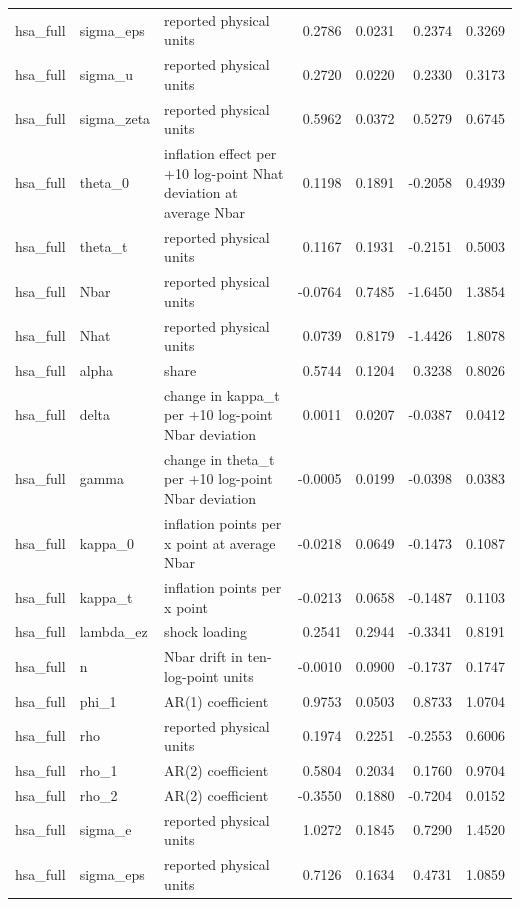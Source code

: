 \begin{tabular}{lllrrrr}
hsa\_full & sigma\_eps & reported physical units & 0.2786 & 0.0231 & 0.2374 & 0.3269 \\
hsa\_full & sigma\_u & reported physical units & 0.2720 & 0.0220 & 0.2330 & 0.3173 \\
hsa\_full & sigma\_zeta & reported physical units & 0.5962 & 0.0372 & 0.5279 & 0.6745 \\
hsa\_full & theta\_0 & inflation effect per +10 log-point Nhat deviation at average Nbar & 0.1198 & 0.1891 & -0.2058 & 0.4939 \\
hsa\_full & theta\_t & reported physical units & 0.1167 & 0.1931 & -0.2151 & 0.5003 \\
hsa\_full & Nbar & reported physical units & -0.0764 & 0.7485 & -1.6450 & 1.3854 \\
hsa\_full & Nhat & reported physical units & 0.0739 & 0.8179 & -1.4426 & 1.8078 \\
hsa\_full & alpha & share & 0.5744 & 0.1204 & 0.3238 & 0.8026 \\
hsa\_full & delta & change in kappa\_t per +10 log-point Nbar deviation & 0.0011 & 0.0207 & -0.0387 & 0.0412 \\
hsa\_full & gamma & change in theta\_t per +10 log-point Nbar deviation & -0.0005 & 0.0199 & -0.0398 & 0.0383 \\
hsa\_full & kappa\_0 & inflation points per x point at average Nbar & -0.0218 & 0.0649 & -0.1473 & 0.1087 \\
hsa\_full & kappa\_t & inflation points per x point & -0.0213 & 0.0658 & -0.1487 & 0.1103 \\
hsa\_full & lambda\_ez & shock loading & 0.2541 & 0.2944 & -0.3341 & 0.8191 \\
hsa\_full & n & Nbar drift in ten-log-point units & -0.0010 & 0.0900 & -0.1737 & 0.1747 \\
hsa\_full & phi\_1 & AR(1) coefficient & 0.9753 & 0.0503 & 0.8733 & 1.0704 \\
hsa\_full & rho & reported physical units & 0.1974 & 0.2251 & -0.2553 & 0.6006 \\
hsa\_full & rho\_1 & AR(2) coefficient & 0.5804 & 0.2034 & 0.1760 & 0.9704 \\
hsa\_full & rho\_2 & AR(2) coefficient & -0.3550 & 0.1880 & -0.7204 & 0.0152 \\
hsa\_full & sigma\_e & reported physical units & 1.0272 & 0.1845 & 0.7290 & 1.4520 \\
hsa\_full & sigma\_eps & reported physical units & 0.7126 & 0.1634 & 0.4731 & 1.0859 \\

\end{tabular}
